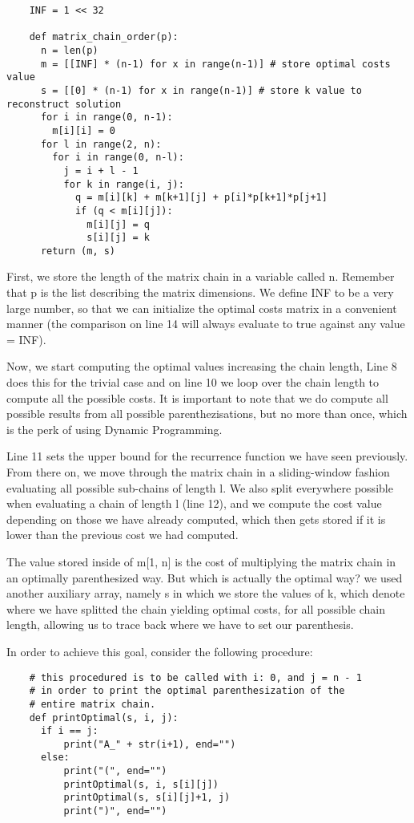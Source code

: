 \begin{verbatim}
    INF = 1 << 32
    
    def matrix_chain_order(p):
      n = len(p)
      m = [[INF] * (n-1) for x in range(n-1)] # store optimal costs value 
      s = [[0] * (n-1) for x in range(n-1)] # store k value to reconstruct solution
      for i in range(0, n-1):
        m[i][i] = 0
      for l in range(2, n):
        for i in range(0, n-l):
          j = i + l - 1
          for k in range(i, j):
            q = m[i][k] + m[k+1][j] + p[i]*p[k+1]*p[j+1]
            if (q < m[i][j]):
              m[i][j] = q
              s[i][j] = k
      return (m, s)
  \end{verbatim}

First, we store the length of the matrix chain in a variable called n. Remember that p is the list describing the matrix dimensions.
We define INF to be a very large number, so that we can initialize the optimal costs matrix in a convenient manner 
(the comparison on line 14 will always evaluate to true against any value = INF).

Now, we start computing the optimal values increasing the chain length, Line 8 does this for the trivial case and on line 10 we loop over the chain length 
to compute all the possible costs. It is important to note that we do compute all possible results from all possible parenthezisations, but no more than once, 
which is the perk of using Dynamic Programming.

Line 11 sets the upper bound for the recurrence function we have seen previously. From there on, we move through the matrix chain in a sliding-window fashion
evaluating all possible sub-chains of length l. We also split everywhere possible when evaluating a chain of length l (line 12), and we compute the cost value depending on 
those we have already computed, which then gets stored if it is lower than the previous cost we had computed.

The value stored inside of m[1, n] is the cost of multiplying the matrix chain in an optimally parenthesized way. But which is actually the optimal way?
we used another auxiliary array, namely s in which we store the values of k, which denote where we have splitted the chain yielding 
optimal costs, for all possible chain length, allowing us to trace back where we have to set our parenthesis.

In order to achieve this goal, consider the following procedure:

\begin{verbatim}
    # this procedured is to be called with i: 0, and j = n - 1
    # in order to print the optimal parenthesization of the 
    # entire matrix chain.
    def printOptimal(s, i, j):
      if i == j:
          print("A_" + str(i+1), end="")
      else:
          print("(", end="")
          printOptimal(s, i, s[i][j])
          printOptimal(s, s[i][j]+1, j)
          print(")", end="")
  \end{verbatim}

